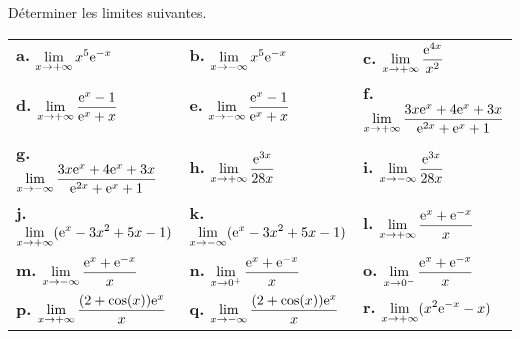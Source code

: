 \documentclass[11pt,fleqn, openany]{book} %
\begin{document}
 



\begin{exercise} Déterminer les limites suivantes.
\renewcommand{\arraystretch}{2.5}

\begin{tabularx}{\linewidth}{XXX}
 \textbf{a.} $\displaystyle \lim_{x \to +\infty} x^5\mathrm{e}^{-x}$ & \textbf{b.} $\displaystyle \lim_{x \to -\infty} x^5\mathrm{e}^{-x}$ &
 \textbf{c.} $\displaystyle \lim_{x \to +\infty} \dfrac{\mathrm{e}^{4x}}{x^2}$ \\

 \textbf{d.} $\displaystyle \lim_{x \to +\infty} \dfrac{\mathrm{e}^x-1}{\mathrm{e}^x+x}$ &  \textbf{e.} $\displaystyle \lim_{x \to -\infty} \dfrac{\mathrm{e}^x-1}{\mathrm{e}^x+x}$ &
  \textbf{f.} $\displaystyle \lim_{x \to +\infty} \dfrac{3x\mathrm{e}^x+4\mathrm{e}^x+3x}{\mathrm{e}^{2x}+\mathrm{e}^x+1}$ \\
 
 \textbf{g.}  $\displaystyle \lim_{x \to -\infty} \dfrac{3x\mathrm{e}^x+4\mathrm{e}^x+3x}{\mathrm{e}^{2x}+\mathrm{e}^x+1}$ &
 \textbf{h.} $\displaystyle \lim_{x \to +\infty} \dfrac{\mathrm{e}^{3x}}{28x}$ & \textbf{i.} $\displaystyle \lim_{x \to -\infty} \dfrac{\mathrm{e}^{3x}}{28x}$ \\
 
  \textbf{j.} $\displaystyle \lim_{x \to +\infty}(\mathrm{e}^x - 3x^2+5x-1)$ &  \textbf{k.} $\displaystyle \lim_{x \to -\infty}(\mathrm{e}^x - 3x^2+5x-1)$ &
 \textbf{l.} $\displaystyle \lim_{x \to +\infty} \dfrac{\mathrm{e}^x+\mathrm{e}^{-x}}{x}$ \\
  \textbf{m.}  $\displaystyle \lim_{x \to -\infty} \dfrac{\mathrm{e}^x+\mathrm{e}^{-x}}{x}$ &
 \textbf{n.}  $\displaystyle \lim_{x \to 0^+} \dfrac{\mathrm{e}^x+\mathrm{e}^{-x}}{x}$ &  \textbf{o.}  $\displaystyle \lim_{x \to 0^-} \dfrac{\mathrm{e}^x+\mathrm{e}^{-x}}{x}$ \\
  
 \textbf{p.}   $\displaystyle \lim_{x \to +\infty} \dfrac{(2+\cos(x))\mathrm{e}^x}{x}$ &  \textbf{q.}  $\displaystyle \lim_{x \to -\infty} \dfrac{(2+\cos(x))\mathrm{e}^x}{x}$ &
   
 \textbf{r.}    $\displaystyle \lim_{x \to +\infty}( x^2\mathrm{e}^{-x}-x)$ 
 
\end{tabularx}\end{exercise}
\end{document}
